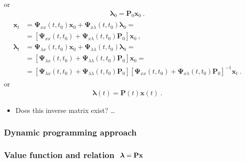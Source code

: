\documentclass[letterpaper,10pt,english]{jupyterBook}
\begin{document}
\sphinxAtStartPar
or
\begin{equation*}
\begin{split}\boldsymbol\lambda_0 = \mathbf{P}_0 \mathbf{x}_0 \ .\end{split}
\end{equation*}
\sphinxAtStartPar
{}
\begin{equation*}
\begin{split}\begin{aligned}
  \mathbf{x}_t 
  & = \boldsymbol\Psi_{xx}(t,t_0) \mathbf{x}_0 + \boldsymbol\Psi_{x\lambda}(t,t_0) \boldsymbol\lambda_0 = \\
  & = \left[ \boldsymbol\Psi_{xx}(t,t_0) + \boldsymbol\Psi_{x\lambda}(t,t_0) \mathbf{P}_0 \right] \mathbf{x}_0 \ , \\
  \boldsymbol{\lambda}_t 
  & = \boldsymbol\Psi_{\lambda x}(t,t_0) \mathbf{x}_0 + \boldsymbol\Psi_{\lambda \lambda}(t,t_0) \boldsymbol\lambda_0 = \\
  & = \left[ \boldsymbol\Psi_{\lambda x}(t,t_0) + \boldsymbol\Psi_{\lambda\lambda}(t,t_0) \mathbf{P}_0 \right] \mathbf{x}_0 = \\
  & = \left[ \boldsymbol\Psi_{\lambda x}(t,t_0) + \boldsymbol\Psi_{\lambda\lambda}(t,t_0) \mathbf{P}_0 \right] \left[ \boldsymbol\Psi_{xx}(t,t_0) + \boldsymbol\Psi_{x\lambda}(t,t_0) \mathbf{P}_0 \right]^{-1} \mathbf{x}_t \ .
\end{aligned}\end{split}
\end{equation*}
\sphinxAtStartPar
or
\begin{equation*}
\begin{split}\boldsymbol\lambda(t) = \mathbf{P}(t) \mathbf{x}(t) \ .\end{split}
\end{equation*}
\sphinxAtStartPar
{}
\begin{itemize}
\item {} 
\sphinxAtStartPar
Does this inverse matrix exist? …

\end{itemize}


\subsubsection{Dynamic programming approach}
\label{\detokenize{ch/control/optimal-control-full-state-linear:dynamic-programming-approach}}\label{\detokenize{ch/control/optimal-control-full-state-linear:control-optimal-full-state-fb-linear-dynamic-programming}}\subsubsection*{Value function and relation \protect\(\ \boldsymbol\lambda = \mathbf{P} \mathbf{x}\protect\)}
\end{document}
